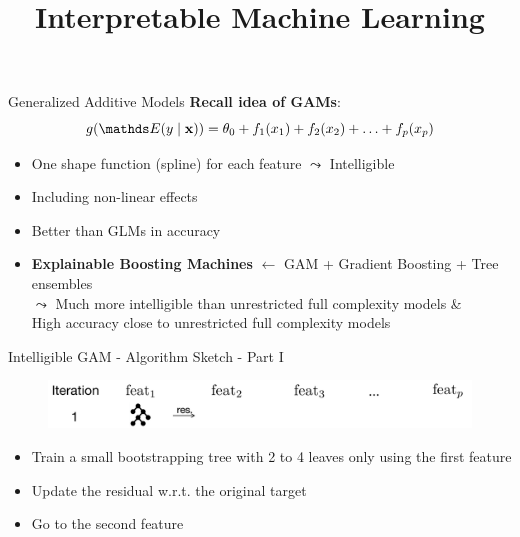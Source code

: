 \documentclass[11pt,compress,t,notes=noshow, aspectratio=169, xcolor=table]{beamer}
\title{Interpretable Machine Learning}
\date{}
\begin{document}
\newcommand{\titlefigure}{figure/ebm.jpg}
\newcommand{\learninggoals}{
\item Motivation from GAM
\item Intelligible GAM
\item Accurate GAM + Pairwise Interactions
\item FAST feature interaction detection}


\begin{frame}{Generalized Additive Models}
\textbf{Recall idea of GAMs}: $$g(\E (y \mid \xv)) = \theta_0 + f_1(x_1) + f_2(x_2) + \ldots + f_p(x_p)$$
\begin{itemize}
    \item One shape function (spline) for each feature $\leadsto$ Intelligible    
    \item Including non-linear effects
    \item Better than GLMs in accuracy
    \item \textbf{Explainable Boosting Machines} $\leftarrow$ GAM + Gradient Boosting + Tree ensembles \\$\leadsto$ Much more intelligible than unrestricted full complexity models \&\\ \:\:\:\:\:\:High accuracy close to unrestricted full complexity models
\end{itemize}
\end{frame}

\begin{frame}{Intelligible GAM - Algorithm Sketch - Part I}

\begin{figure}
    \centering
    \includegraphics[width=1\linewidth]{slides//02_interpretable-models//figure/EBM_Step1.png}
    \label{fig:Intelligible EBM_Step1}
\end{figure}
\begin{itemize}
    \item Train a small bootstrapping tree with 2 to 4 leaves only using the first feature
    \item Update the residual w.r.t. the original target
    \item Go to the second feature
\end{itemize}
\end{frame}
\end{document}
